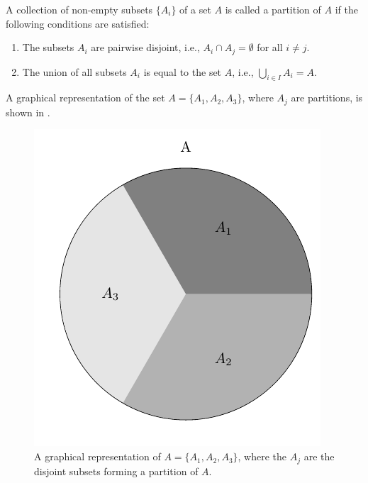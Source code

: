 \begin{definition}[Partition]
	\label{def:partition}
	A collection of non-empty subsets $\{A_i\}$ of a set $A$ is called a partition of $A$ if the following conditions are satisfied:
	\begin{enumerate}
		\item The subsets $A_i$ are pairwise disjoint, i.e., $A_i \cap A_j = \emptyset$ for all \(i \neq j\).
		\item The union of all subsets $A_i$ is equal to the set $A$, i.e., $\bigcup_{i \in I} A_i = A$.
	\end{enumerate}
	
	A graphical representation of the set $A=\{A_1,A_2,A_3\}$, where $A_j$ are partitions, is shown in .
	\begin{figure}[h]
		\centering
		\includegraphics[]{figures/set_partition.pdf}
		\caption{A graphical representation of $A = \{A_1, A_2, A_3\}$, where the $A_j$ are the disjoint subsets forming a partition of $A$.}
		\label{fig:set_partition}
	\end{figure}
\end{definition}
